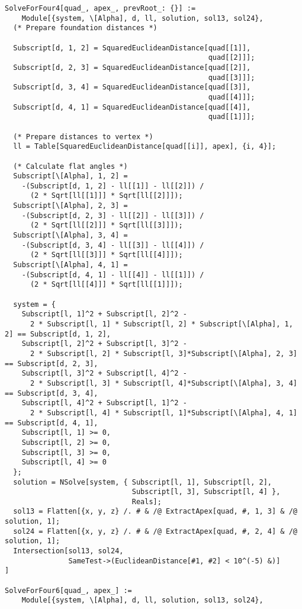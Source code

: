 \documentclass[../main.tex]{subfiles}
\begin{document}
\begin{lstlisting}
SolveForFour4[quad_, apex_, prevRoot_: {}] :=
    Module[{system, \[Alpha], d, ll, solution, sol13, sol24},
  (* Prepare foundation distances *)

  Subscript[d, 1, 2] = SquaredEuclideanDistance[quad[[1]],
                                                quad[[2]]];
  Subscript[d, 2, 3] = SquaredEuclideanDistance[quad[[2]],
                                                quad[[3]]];
  Subscript[d, 3, 4] = SquaredEuclideanDistance[quad[[3]],
                                                quad[[4]]];
  Subscript[d, 4, 1] = SquaredEuclideanDistance[quad[[4]],
                                                quad[[1]]];

  (* Prepare distances to vertex *)
  ll = Table[SquaredEuclideanDistance[quad[[i]], apex], {i, 4}];

  (* Calculate flat angles *)
  Subscript[\[Alpha], 1, 2] =
    -(Subscript[d, 1, 2] - ll[[1]] - ll[[2]]) /
      (2 * Sqrt[ll[[1]]] * Sqrt[ll[[2]]]);
  Subscript[\[Alpha], 2, 3] =
    -(Subscript[d, 2, 3] - ll[[2]] - ll[[3]]) /
      (2 * Sqrt[ll[[2]]] * Sqrt[ll[[3]]]);
  Subscript[\[Alpha], 3, 4] =
    -(Subscript[d, 3, 4] - ll[[3]] - ll[[4]]) /
      (2 * Sqrt[ll[[3]]] * Sqrt[ll[[4]]]);
  Subscript[\[Alpha], 4, 1] =
    -(Subscript[d, 4, 1] - ll[[4]] - ll[[1]]) /
      (2 * Sqrt[ll[[4]]] * Sqrt[ll[[1]]]);

  system = {
    Subscript[l, 1]^2 + Subscript[l, 2]^2 -
      2 * Subscript[l, 1] * Subscript[l, 2] * Subscript[\[Alpha], 1, 2] == Subscript[d, 1, 2],
    Subscript[l, 2]^2 + Subscript[l, 3]^2 -
      2 * Subscript[l, 2] * Subscript[l, 3]*Subscript[\[Alpha], 2, 3] == Subscript[d, 2, 3],
    Subscript[l, 3]^2 + Subscript[l, 4]^2 -
      2 * Subscript[l, 3] * Subscript[l, 4]*Subscript[\[Alpha], 3, 4] == Subscript[d, 3, 4],
    Subscript[l, 4]^2 + Subscript[l, 1]^2 -
      2 * Subscript[l, 4] * Subscript[l, 1]*Subscript[\[Alpha], 4, 1] == Subscript[d, 4, 1],
    Subscript[l, 1] >= 0,
    Subscript[l, 2] >= 0,
    Subscript[l, 3] >= 0,
    Subscript[l, 4] >= 0
  };
  solution = NSolve[system, { Subscript[l, 1], Subscript[l, 2],
                              Subscript[l, 3], Subscript[l, 4] },
                              Reals];
  sol13 = Flatten[{x, y, z} /. # & /@ ExtractApex[quad, #, 1, 3] & /@ solution, 1];
  sol24 = Flatten[{x, y, z} /. # & /@ ExtractApex[quad, #, 2, 4] & /@ solution, 1];
  Intersection[sol13, sol24,
               SameTest->(EuclideanDistance[#1, #2] < 10^(-5) &)]
]

SolveForFour6[quad_, apex_] :=
    Module[{system, \[Alpha], d, ll, solution, sol13, sol24},


\end{lstlisting}
\end{document}
